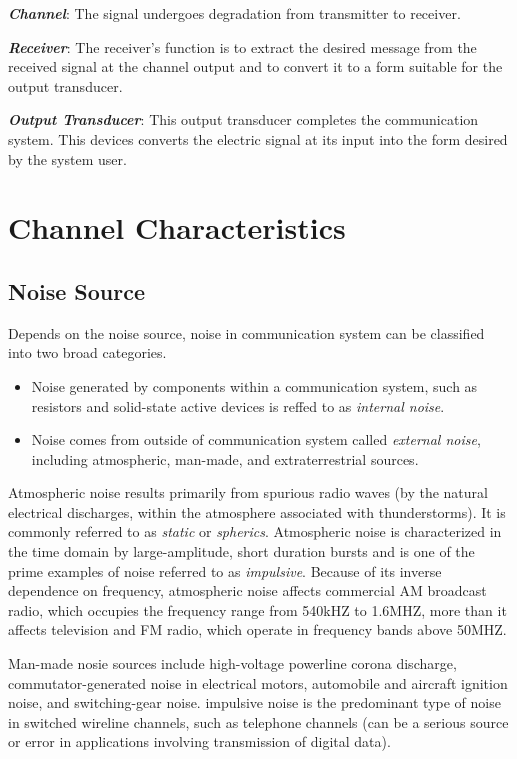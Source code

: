 \documentclass[12pt,a4paper]{book}
\begin{document}
\textbf{\textit{Channel}}: The signal undergoes degradation from transmitter to receiver.

\textbf{\textit{Receiver}}: The receiver's function is to extract the desired message from the received signal at the channel output and to convert it to a form suitable for the output transducer.

\textbf{\textit{Output Transducer}}: This output transducer completes the communication system. This devices converts the electric signal at its input into the form desired by the system user.
\section{Channel Characteristics}
\subsection{Noise Source}
Depends on the noise source, noise in communication system can be classified into two broad categories.
\begin{itemize}
  \item Noise generated by components within a communication system, such as resistors and solid-state active devices is reffed to as \textit{internal noise}.
  \item Noise comes from outside of communication system called \textit{external noise}, including atmospheric, man-made, and extraterrestrial sources.
\end{itemize}

Atmospheric noise results primarily from spurious radio waves (by the natural electrical discharges, within the atmosphere associated with thunderstorms). It is commonly referred to as \textit{static} or \textit{spherics}. Atmospheric noise is characterized in the time domain by large-amplitude, short duration bursts and is one of the prime examples of noise referred to as \textit{impulsive}. Because of its inverse dependence on frequency, atmospheric noise affects commercial AM broadcast radio, which occupies the frequency range from 540kHZ to 1.6MHZ, more than it affects television and FM radio, which operate in frequency bands above 50MHZ.

Man-made nosie sources include 
high-voltage powerline corona discharge, 
commutator-generated noise in electrical motors,
automobile and aircraft ignition noise, and switching-gear noise. impulsive noise is the predominant type of noise in switched wireline channels, such as telephone channels (can be a serious source or error in applications involving transmission of digital data).
\end{document}
